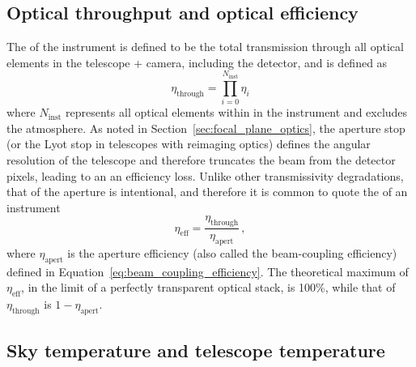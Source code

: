 
\subsection{Optical throughput and optical efficiency}
\label{sec:sensitivity_optical_throughput_optical_efficiency}

The  of the instrument is defined to be the total transmission through all optical elements in the telescope + camera, including the detector, and is defined as
\begin{equation}
    \eta_{\mathrm{through}} = \prod_{i=0}^{N_{\mathrm{inst}}} \eta_{i}
    \label{eq:throughput}
\end{equation}
where $N_{\mathrm{inst}}$ represents all optical elements within in the instrument and excludes the atmosphere. As noted in Section~\ref{sec:focal_plane_optics}, the aperture stop (or the Lyot stop in telescopes with reimaging optics) defines the angular resolution of the telescope and therefore truncates the beam from the detector pixels, leading to an an efficiency loss. Unlike other transmissivity degradations, that of the aperture is intentional, and therefore it is common to quote the  of an instrument
\begin{equation}
    \eta_{\mathrm{eff}} = \frac{\eta_{\mathrm{through}}}{\eta_{\mathrm{apert}}} \, ,
    \label{eq:optical_efficiency}
\end{equation}
where $\eta_{\mathrm{apert}}$ is the aperture efficiency (also called the beam-coupling efficiency) defined in Equation~\ref{eq:beam_coupling_efficiency}. The theoretical maximum of $\eta_{\mathrm{eff}}$, in the limit of a perfectly transparent optical stack, is 100\%, while that of $\eta_{\mathrm{through}}$ is $1 - \eta_{\mathrm{apert}}$.


\subsection{Sky temperature and telescope temperature}
\label{sec:sensitivity_telescope_temperature_sky_temperature}

